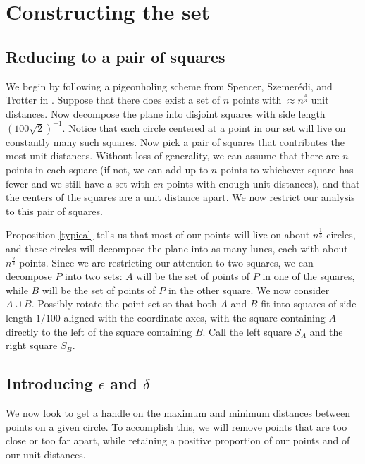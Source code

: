 \documentclass[12pt]{article}
\begin{document}
\section{Constructing the set}
\subsection{Reducing to a pair of squares}
We begin by following a pigeonholing scheme from Spencer, Szemer\'edi, and Trotter in \cite{SST84}. Suppose that there does exist a set of $n$ points with $\approx n^\frac{4}{3}$ unit distances. Now decompose the plane into disjoint squares with side length $(100\sqrt 2)^{-1}.$ Notice that each circle centered at a point in our set will live on constantly many such squares. Now pick a pair of squares that contributes the most unit distances. Without loss of generality, we can assume that there are $n$ points in each square (if not, we can add up to $n$ points to whichever square has fewer and we still have a set with $cn$ points with enough unit distances), and that the centers of the squares are a unit distance apart. We now restrict our analysis to this pair of squares.

Proposition \ref{typical} tells us that most of our points will live on about $n^\frac{1}{3}$ circles, and these circles will decompose the plane into as many lunes, each with about $n^\frac{2}{3}$ points. Since we are restricting our attention to two squares, we can decompose $P$ into two sets: $A$ will be the set of points of $P$ in one of the squares, while $B$ will be the set of points of $P$ in the other square. We now consider $A\cup B.$ Possibly rotate the point set so that both $A$ and $B$ fit into squares of side-length $1/100$ aligned with the coordinate axes, with the square containing $A$ directly to the left of the square containing $B.$ Call the left square $S_A$ and the right square $S_B.$

\subsection{Introducing $\epsilon$ and $\delta$}
We now look to get a handle on the maximum and minimum distances between points on a given circle. To accomplish this, we will remove points that are too close or too far apart, while retaining a positive proportion of our points and of our unit distances.
\end{document}
